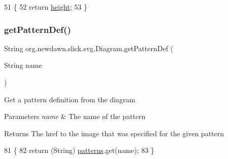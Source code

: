 \begin{DoxyCode}
51                              \{
52         \textcolor{keywordflow}{return} \mbox{\hyperlink{classorg_1_1newdawn_1_1slick_1_1svg_1_1_diagram_a5b6d7878e986b788521bb72fb0168518}{height}};
53     \}
\end{DoxyCode}
\mbox{\label{classorg_1_1newdawn_1_1slick_1_1svg_1_1_diagram_a42164eb0201d4ab2b3d58ee7fd5aad26}} 
\subsubsection{\texorpdfstring{get\+Pattern\+Def()}{getPatternDef()}}
{\footnotesize\ttfamily String org.\+newdawn.\+slick.\+svg.\+Diagram.\+get\+Pattern\+Def (\begin{DoxyParamCaption}\item[{String}]{name }\end{DoxyParamCaption})\hspace{0.3cm}{\ttfamily [inline]}}

Get a pattern definition from the diagram


\begin{DoxyParams}{Parameters}
{\em name} & The name of the pattern \\
\hline
\end{DoxyParams}
\begin{DoxyReturn}{Returns}
The href to the image that was specified for the given pattern 
\end{DoxyReturn}

\begin{DoxyCode}
81                                              \{
82         \textcolor{keywordflow}{return} (String) \mbox{\hyperlink{classorg_1_1newdawn_1_1slick_1_1svg_1_1_diagram_ae97126aa813213972c4c755710ab13e6}{patterns}}.get(name);
83     \}
\end{DoxyCode}
\mbox{\label{classorg_1_1newdawn_1_1slick_1_1svg_1_1_diagram_a1e03fcbc57b25710101ef5aea4d43af1}} 
